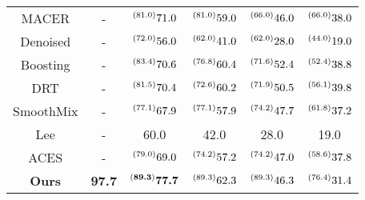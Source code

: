 \begin{table*}[t]
\begin{tabular}{cc|c|cccc}
    \multicolumn{2}{c|}{MACER \citeyear{zhai2020macer} \cite{zhai2020macer} }  & -   &  $ \prescript{(81.0)}{}{71.0}$   &   $ \prescript{(81.0)}{}{59.0}$     &    $ \prescript{(66.0)}{}{46.0}$    &   $ \prescript{(66.0)}{}{38.0}$      \\
    \multicolumn{2}{c|}{Denoised \citeyear{salman2020denoised} \cite{salman2020denoised} }  & -   &  $ \prescript{(72.0)}{}{56.0}$   &   $ \prescript{(62.0)}{}{41.0}$     &    $ \prescript{(62.0)}{}{28.0}$    &   $ \prescript{(44.0)}{}{19.0}$      \\
    \multicolumn{2}{c|}{Boosting \citeyear{horvath2021boosting} \cite{horvath2021boosting} }  & -   &  $ \prescript{(83.4)}{}{70.6}$   &   $ \prescript{(76.8)}{}{60.4}$     &    $ \prescript{(71.6)}{}{52.4}$    &   $ \prescript{(52.4)}{}{38.8}$      \\
    \multicolumn{2}{c|}{DRT \citeyear{yang2021certified} \cite{yang2021certified} }  & -   &  $ \prescript{(81.5)}{}{70.4}$   &   $ \prescript{(72.6)}{}{60.2}$     &    $ \prescript{(71.9)}{}{50.5}$    &   $ \prescript{(56.1)}{}{39.8}$      \\
    \multicolumn{2}{c|}{SmoothMix \citeyear{jeong2021smoothmix} \cite{jeong2021smoothmix} }  & -   &  $ \prescript{(77.1)}{}{67.9}$   &   $ \prescript{(77.1)}{}{57.9}$     &    $ \prescript{(74.2)}{}{47.7}$    &   $ \prescript{(61.8)}{}{37.2}$      \\
    \multicolumn{2}{c|}{Lee \citeyear{lee2021provable} \cite{lee2021provable} }  & -   &  60.0   &   42.0     &    28.0    &   19.0      \\
    \multicolumn{2}{c|}{ACES \citeyear{horvath2022robust} \cite{horvath2022robust} }  & -   &  $ \prescript{(79.0)}{}{69.0}$   &   $ \prescript{(74.2)}{}{57.2}$     &    $ \prescript{(74.2)}{}{47.0}$    &   $ \prescript{(58.6)}{}{37.8}$      \\ \hline
    \multicolumn{2}{c|}{\textbf{Ours}}  & \textbf{97.7}  &  $ \prescript{(\textbf{89.3})}{}{\textbf{77.7}}$   &   $ \prescript{(89.3)}{}{62.3}$     &    $ \prescript{(89.3)}{}{46.3}$    &   $ \prescript{(76.4)}{}{31.4}$      \\ \hline
 \end{tabular}
\end{table*}



